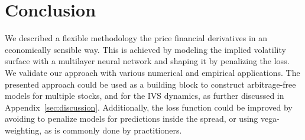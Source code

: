 
\section{Conclusion}\label{sec:ccl}

We described a flexible methodology the price financial derivatives in an economically sensible way.
This is achieved by modeling the implied volatility surface with a multilayer neural network and shaping it by penalizing the loss.
We validate our approach with various numerical and empirical applications.
The presented approach could be used as a building block to construct arbitrage-free models for multiple stocks, and for the IVS dynamics, as further discussed in Appendix~\ref{sec:discussion}.
Additionally, the loss function could be improved by avoiding to penalize models for predictions inside the spread, or using vega-weighting, as is commonly done by practitioners.